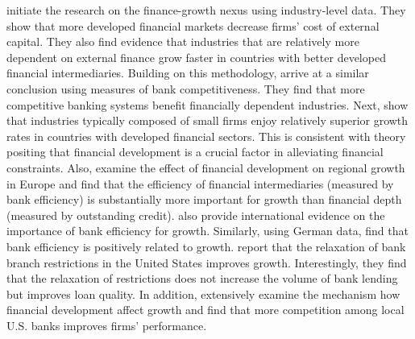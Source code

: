 \begin{refsection}
\textcite{RajanZingales1998} initiate the research on the finance-growth nexus using industry-level data. They show that more developed financial markets decrease firms' cost of external capital. They also find evidence that industries that are relatively more dependent on external finance grow faster in countries with better developed financial intermediaries. Building on this methodology, \textcite{ClaessensLaeven2005} arrive at a similar conclusion using measures of bank competitiveness. They find that more competitive banking systems benefit financially dependent industries. Next, \textcite{Becketal2005} show that industries typically composed of small firms enjoy relatively superior growth rates in countries with developed financial sectors. This is consistent with theory positing that financial development is a crucial factor in alleviating financial constraints. Also, \textcite{Hasanetal2009} examine the effect of financial development on regional growth in Europe and find that the efficiency of financial intermediaries (measured by bank efficiency) is substantially more important for growth than financial depth (measured by outstanding credit). \textcite{Bergeretal2004} also provide international evidence on the importance of bank efficiency for growth. Similarly, using German data, \textcite{KoetterWedow2010} find that bank efficiency is positively related to growth. \textcite{JayaratneStrahan1996} report that the relaxation of bank branch restrictions in the United States improves growth. Interestingly, they find that the relaxation of restrictions does not increase the volume of bank lending but improves loan quality. In addition, \textcite{CetorelliStraha2006} extensively examine the mechanism how financial development affect growth and find that more competition among local U.S. banks improves firms' performance. 


\end{refsection}
